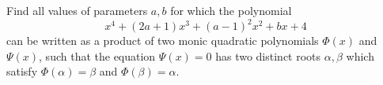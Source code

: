 Find all values of parameters $a,b$ for which the polynomial
$$x^4+(2a+1)x^3+(a-1)^2x^2+bx+4$$can be written as a product of two monic quadratic polynomials $\Phi(x)$ and $\Psi(x)$, such that the equation $\Psi(x)=0$ has two distinct roots $\alpha,\beta$ which satisfy $\Phi(\alpha)=\beta$ and $\Phi(\beta)=\alpha$.